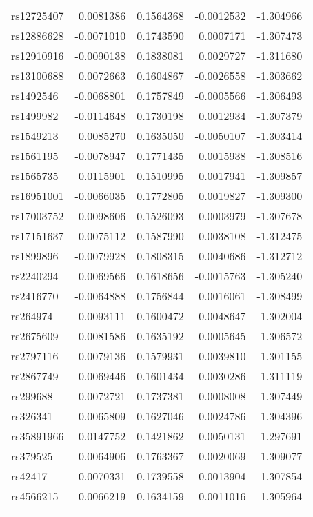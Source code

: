 \documentclass[
]{article}
\theoremstyle{plain}
\begin{document}
{\begin{longtable}[t]{lrrrr}
\addlinespace
rs12725407 & 0.0081386 & 0.1564368 & -0.0012532 & -1.304966\\
rs12886628 & -0.0071010 & 0.1743590 & 0.0007171 & -1.307473\\
rs12910916 & -0.0090138 & 0.1838081 & 0.0029727 & -1.311680\\
rs13100688 & 0.0072663 & 0.1604867 & -0.0026558 & -1.303662\\
rs1492546 & -0.0068801 & 0.1757849 & -0.0005566 & -1.306493\\
\addlinespace
rs1499982 & -0.0114648 & 0.1730198 & 0.0012934 & -1.307379\\
rs1549213 & 0.0085270 & 0.1635050 & -0.0050107 & -1.303414\\
rs1561195 & -0.0078947 & 0.1771435 & 0.0015938 & -1.308516\\
rs1565735 & 0.0115901 & 0.1510995 & 0.0017941 & -1.309857\\
rs16951001 & -0.0066035 & 0.1772805 & 0.0019827 & -1.309300\\
\addlinespace
rs17003752 & 0.0098606 & 0.1526093 & 0.0003979 & -1.307678\\
rs17151637 & 0.0075112 & 0.1587990 & 0.0038108 & -1.312475\\
rs1899896 & -0.0079928 & 0.1808315 & 0.0040686 & -1.312712\\
rs2240294 & 0.0069566 & 0.1618656 & -0.0015763 & -1.305240\\
rs2416770 & -0.0064888 & 0.1756844 & 0.0016061 & -1.308499\\
\addlinespace
rs264974 & 0.0093111 & 0.1600472 & -0.0048647 & -1.302004\\
rs2675609 & 0.0081586 & 0.1635192 & -0.0005645 & -1.306572\\
rs2797116 & 0.0079136 & 0.1579931 & -0.0039810 & -1.301155\\
rs2867749 & 0.0069446 & 0.1601434 & 0.0030286 & -1.311119\\
rs299688 & -0.0072721 & 0.1737381 & 0.0008008 & -1.307449\\
\addlinespace
rs326341 & 0.0065809 & 0.1627046 & -0.0024786 & -1.304396\\
rs35891966 & 0.0147752 & 0.1421862 & -0.0050131 & -1.297691\\
rs379525 & -0.0064906 & 0.1763367 & 0.0020069 & -1.309077\\
rs42417 & -0.0070331 & 0.1739558 & 0.0013904 & -1.307854\\
rs4566215 & 0.0066219 & 0.1634159 & -0.0011016 & -1.305964\\
\addlinespace

\end{longtable}}
\end{document}
